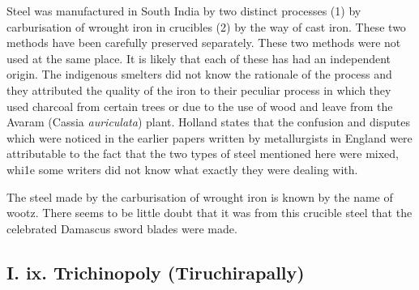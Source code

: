 Steel was manufactured in South India by two distinct processes (1) by carburisation of wrought iron in crucibles (2) by the way of cast iron. These two methods have been carefully preserved separately. These two methods were not used at the same place. It is likely that each of these has had an independent origin. The indigenous smelters did not know the rationale of the process and they attributed the quality of the iron to their peculiar process in which they used charcoal from certain trees or due to the use of wood and leave from the Avaram (Cassia {\it auriculata}) plant. Holland states that the confusion and disputes which were noticed in the earlier papers written by metallurgists in England were attributable to the fact that the two types of steel mentioned here were mixed, whi1e some writers did not know what exactly they were dealing with.

The steel made by the carburisation of wrought iron is known by the name of wootz. There seems to be little doubt that it was from this crucible steel that the celebrated Damascus sword blades were made. 

\vspace{-.3cm}

\subsection*{I. ix. Trichinopoly (Tiruchirapally)}\label{subsection-9}

\vspace{-.2cm}

